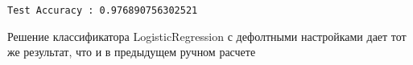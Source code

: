 \documentclass[11pt]{article}
\begin{document}
    \begin{Verbatim}[commandchars=\\\{\}]
Test Accuracy : 0.976890756302521

    \end{Verbatim}

    Решение классификатора LogisticRegression с дефолтными настройками дает
тот же результат, что и в предыдущем ручном расчете


    
    
    
    
\end{document}
